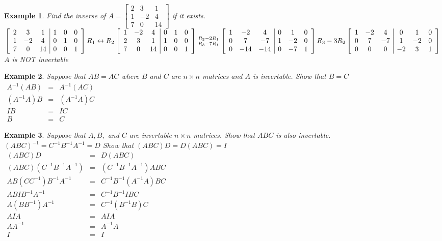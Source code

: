 \documentclass[a4paper,12pt,openany]{book}
\newcommand*{\bfrac}[2]{\genfrac{}{}{0pt}{}{#1}{#2}}
\theoremstyle{defn}
\theoremstyle{expl}
\newtheorem{expl}{Example}[section]
\begin{document}
\begin{expl}
\textup{Find the inverse of $A=\left[\begin{array}{ccc}2&3&1\\1&-2&4\\7&0&14\end{array}\right]$ if it exists.\\}
$\left[\begin{array}{ccc|ccc}2&3&1&1&0&0\\1&-2&4&0&1&0\\7&0&14&0&0&1\end{array}\right]R_1\leftrightarrow R_2\left[\begin{array}{ccc|ccc}1&-2&4&0&1&0\\2&3&1&1&0&0\\7&0&14&0&0&1\end{array}\right]\bfrac{R_2-2R_1}{R_3-7R_1}\left[\begin{array}{ccc|ccc}1&-2&4&0&1&0\\0&7&-7&1&-2&0\\0&-14&-14&0&-7&1\end{array}\right]R_3-3R_2\left[\begin{array}{ccc|ccc}1&-2&4&0&1&0\\0&7&-7&1&-2&0\\0&0&0&-2&3&1\end{array}\right]\\$
\textup{$A$ is NOT invertable}
\end{expl}
\begin{expl}
\textup{Suppose that $AB=AC$ where $B$ and $C$ are $n\times n$ matrices and $A$ is invertable. Show that $B=C$}\\
$\begin{array}{ccc}
A^{-1}(AB)&=&A^{-1}(AC)\\
(A^{-1}A)B&=&(A^{-1}A)C\\
IB&=&IC\\
B&=&C
\end{array}$
\end{expl}
\begin{expl}
\textup{Suppose that $A,B,$ and $C$ are invertable $n\times n$ matrices. Show that $ABC$ is also invertable.}\\
$(ABC)^{-1}=C^{-1}B^{-1}A^{-1}=D$ \textup{Show that $(ABC)D=D(ABC)=I$}\\
$\begin{array}{ccc}
(ABC)D&=&D(ABC)\\
(ABC)(C^{-1}B^{-1}A^{-1})&=&(C^{-1}B^{-1}A^{-1})ABC\\
AB(CC^{-1})B^{-1}A^{-1}&=&C^{-1}B^{-1}(A^{-1}A)BC\\
ABIB^{-1}A^{-1}&=&C^{-1}B^{-1}IBC\\
A(BB^{-1})A^{-1}&=&C^{-1}(B^{-1}B)C\\
AIA&=&AIA\\
AA^{-1}&=&A^{-1}A\\
I&=&I
\end{array}$
\end{expl}
\end{document}
